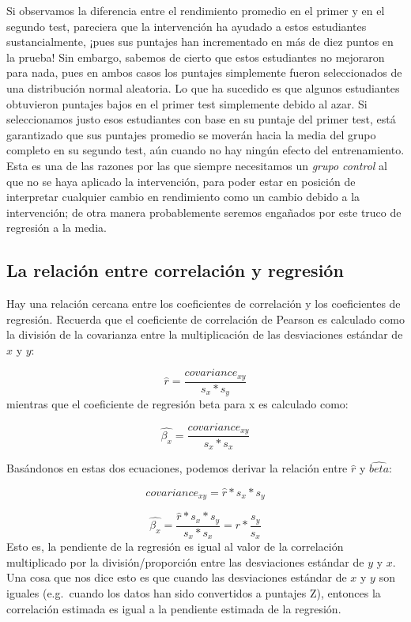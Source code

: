 \documentclass[
  12pt,
]{book}
\theoremstyle{definition}
\theoremstyle{definition}
\theoremstyle{definition}
\theoremstyle{remark}
\begin{document}
Si observamos la diferencia entre el rendimiento promedio en el primer y en el segundo test, pareciera que la intervención ha ayudado a estos estudiantes sustancialmente, ¡pues sus puntajes han incrementado en más de diez puntos en la prueba! Sin embargo, sabemos de cierto que estos estudiantes no mejoraron para nada, pues en ambos casos los puntajes simplemente fueron seleccionados de una distribución normal aleatoria. Lo que ha sucedido es que algunos estudiantes obtuvieron puntajes bajos en el primer test simplemente debido al azar. Si seleccionamos justo esos estudiantes con base en su puntaje del primer test, está garantizado que sus puntajes promedio se moverán hacia la media del grupo completo en su segundo test, aún cuando no hay ningún efecto del entrenamiento. Esta es una de las razones por las que siempre necesitamos un \emph{grupo control} al que no se haya aplicado la intervención, para poder estar en posición de interpretar cualquier cambio en rendimiento como un cambio debido a la intervención; de otra manera probablemente seremos engañados por este truco de regresión a la media.

\hypertarget{la-relaciuxf3n-entre-correlaciuxf3n-y-regresiuxf3n}{%
\subsection{La relación entre correlación y regresión}\label{la-relaciuxf3n-entre-correlaciuxf3n-y-regresiuxf3n}}

Hay una relación cercana entre los coeficientes de correlación y los coeficientes de regresión. Recuerda que el coeficiente de correlación de Pearson es calculado como la división de la covarianza entre la multiplicación de las desviaciones estándar de \(x\) y \(y\):

\[
\hat{r} = \frac{covariance_{xy}}{s_x * s_y}
\]
mientras que el coeficiente de regresión beta para x es calculado como:

\[
\hat{\beta_x} = \frac{covariance_{xy}}{s_x*s_x}
\]

Basándonos en estas dos ecuaciones, podemos derivar la relación entre \(\hat{r}\) y \(\hat{beta}\):

\[
covariance_{xy} = \hat{r} * s_x * s_y
\]

\[
\hat{\beta_x} =  \frac{\hat{r} * s_x * s_y}{s_x * s_x} = r * \frac{s_y}{s_x}
\]
Esto es, la pendiente de la regresión es igual al valor de la correlación multiplicado por la división/proporción entre las desviaciones estándar de \(y\) y \(x\). Una cosa que nos dice esto es que cuando las desviaciones estándar de \(x\) y \(y\) son iguales (e.g.~cuando los datos han sido convertidos a puntajes Z), entonces la correlación estimada es igual a la pendiente estimada de la regresión.
\end{document}
